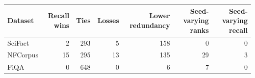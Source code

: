 \begin{tabular}{lrrrrrr}
\toprule
Dataset & Recall wins & Ties & Losses & Lower redundancy & Seed-varying ranks & Seed-varying recall\\
\midrule
SciFact & 2 & 293 & 5 & 158 & 0 & 0\\
NFCorpus & 15 & 295 & 13 & 135 & 29 & 3\\
FiQA & 0 & 648 & 0 & 6 & 7 & 0\\
\bottomrule
\end{tabular}
